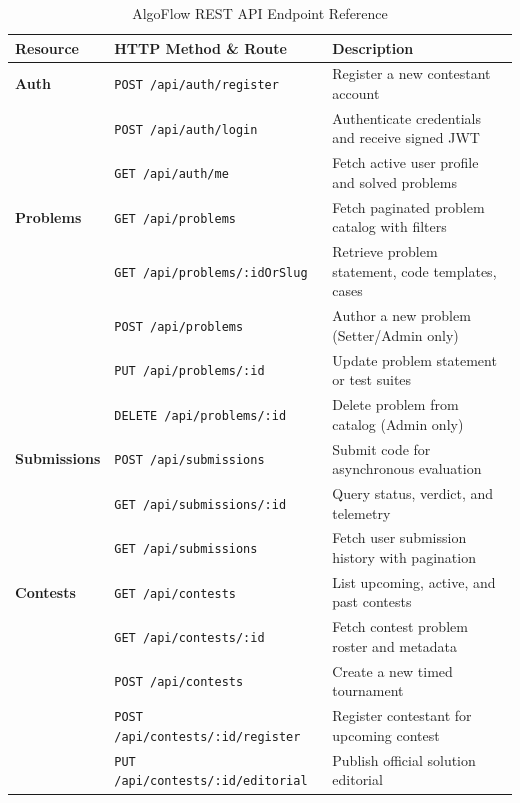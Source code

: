 \documentclass[12pt,a4paper]{report}
\begin{document}
\begin{table}[H]
\centering
\footnotesize
\setlength{\tabcolsep}{3.5pt}
\renewcommand{\arraystretch}{1.15}
\caption{AlgoFlow REST API Endpoint Reference}
\label{tab:api_summary}
\begin{tabularx}{\textwidth}{@{}l >{\raggedright\arraybackslash}p{5.4cm} >{\raggedright\arraybackslash}X@{}}
\toprule
\textbf{Resource} & \textbf{HTTP Method \& Route} & \textbf{Description} \\ \midrule
\textbf{Auth} & \texttt{POST /api/auth/register} & Register a new contestant account \\
              & \texttt{POST /api/auth/login} & Authenticate credentials and receive signed JWT \\
              & \texttt{GET /api/auth/me} & Fetch active user profile and solved problems \\ \midrule
\textbf{Problems} & \texttt{GET /api/problems} & Fetch paginated problem catalog with filters \\
                  & \texttt{GET /api/problems/:idOrSlug} & Retrieve problem statement, code templates, cases \\
                  & \texttt{POST /api/problems} & Author a new problem (Setter/Admin only) \\
                  & \texttt{PUT /api/problems/:id} & Update problem statement or test suites \\
                  & \texttt{DELETE /api/problems/:id} & Delete problem from catalog (Admin only) \\ \midrule
\textbf{Submissions} & \texttt{POST /api/submissions} & Submit code for asynchronous evaluation \\
                     & \texttt{GET /api/submissions/:id} & Query status, verdict, and telemetry \\
                     & \texttt{GET /api/submissions} & Fetch user submission history with pagination \\ \midrule
\textbf{Contests} & \texttt{GET /api/contests} & List upcoming, active, and past contests \\
                  & \texttt{GET /api/contests/:id} & Fetch contest problem roster and metadata \\
                  & \texttt{POST /api/contests} & Create a new timed tournament \\
                  & \texttt{POST /api/contests/:id/register} & Register contestant for upcoming contest \\
                  & \texttt{PUT /api/contests/:id/editorial} & Publish official solution editorial \\ \midrule

\end{tabularx}
\end{table}
\end{document}
